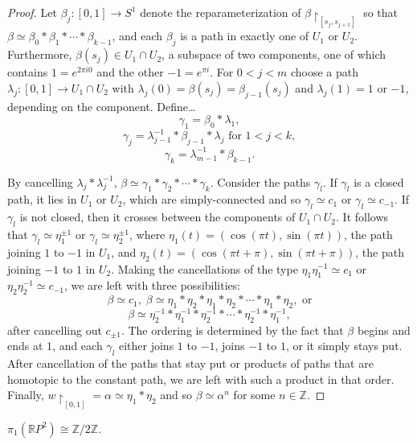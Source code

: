 \begin{proof}
Let $\beta_j : [0,1] \rightarrow S^1$ denote the reparameterization of $\beta \upharpoonright_{[s_j, s_{j+1}]}$ so that
$\beta \simeq \beta_0 * \beta_1 * \cdots * \beta_{k-1}$, and each $\beta_j$ is a path in exactly one of $U_1$ or $U_2$.
Furthermore, $\beta(s_j) \in U_1 \cap U_2$, a subspace of two components, one of which contains $1 = e^{2 \pi i 0}$ and the other $-1 = e^{\pi i}$. For
$0 < j < m$ choose a path $\lambda_j : [0,1] \rightarrow U_1 \cap U_2$ with $\lambda_j(0) = \beta(s_j) = \beta_{j-1}(s_j)$ and $\lambda_j(1) = 1$ or $-1$,
depending on the component. Define\dots
$$\gamma_1 = \beta_0 * \lambda_1,$$
$$\gamma_j = \lambda_{j-1}^{-1} * \beta_{j-1} * \lambda_j \textrm{ for } 1 < j < k,$$
$$\gamma_k = \lambda^{-1}_{m-1} * \beta_{k-1}.$$

By cancelling $\lambda_j * \lambda_j^{-1}$, $\beta \simeq \gamma_1 * \gamma_2 * \cdots * \gamma_k$. Consider the paths $\gamma_l$.
If $\gamma_l$ is a closed path, it lies in $U_1$ or $U_2$, which are simply-connected and so $\gamma_l \simeq c_1$ or $\gamma_l \simeq c_{-1}$.
If $\gamma_l$ is not closed, then it crosses between the components of $U_1 \cap U_2$. It follows that $\gamma_l \simeq \eta_1^{\pm 1}$ or $\gamma_l \simeq \eta_2^{\pm 1}$,
where $\eta_1(t) = (\cos(\pi t), \sin(\pi t))$, the path joining $1$ to $-1$ in $U_1$, and $\eta_2(t) = (\cos(\pi t + \pi), \sin(\pi t + \pi))$, the path joining $-1$ to $1$ in $U_2$.
Making the cancellations of the type $\eta_1\eta_1^{-1} \simeq c_1$ or $\eta_2\eta_2^{-1} \simeq c_{-1}$, we
are left with three possibilities:
$$\beta \simeq c_1, \; \beta \simeq \eta_1 * \eta_2 * \eta_1 * \eta_2 * \cdots * \eta_1 * \eta_2, \textrm{ or}$$
$$\beta \simeq \eta_2^{-1} * \eta_1^{-1} * \eta_2^{-1} * \cdots * \eta_2^{-1}* \eta_1^{-1},$$
after cancelling out $c_{\pm 1}$. The ordering is determined by the fact that $\beta$ begins and ends at $1$, and each $\gamma_l$ either joins $1$ to $-1$, joins $-1$ to $1$,
or it simply stays put. After cancellation of the paths that stay put or products of paths that are homotopic to the constant path, we are left with such a product in that order.
Finally, $w \upharpoonright_{[0,1]} = \alpha \simeq \eta_1 * \eta_2$ and so $\beta \simeq \alpha^n$ for some $n \in \mathbb{Z}$.
\end{proof}

\begin{theorem}
$\pi_1(\mathbb{R}P^2) \cong \mathbb{Z}/2\mathbb{Z}$.
\end{theorem}

